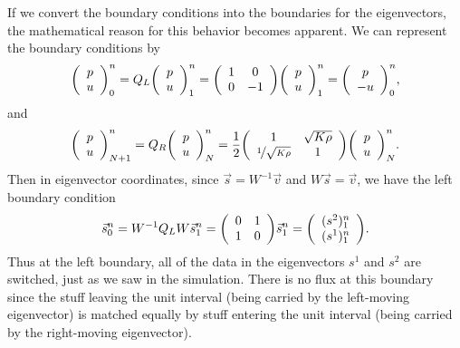 \documentclass[12pt]{article}
\begin{document}
 If we convert the boundary conditions into the boundaries for the eigenvectors, the mathematical reason for this behavior becomes apparent.
 We can represent the boundary conditions by
 $$\qty(\begin{array}{c} p \\ u \end{array})_{0}^n = Q_L \qty(\begin{array}{c} p \\ u \end{array})_{1}^n = \qty(\begin{array}{cc} 1 & 0 \\ 0 & -1 \end{array})\qty(\begin{array}{c} p \\ u \end{array})_{1}^n = \qty(\begin{array}{c} p \\ -u \end{array})_{0}^n,$$
 and 
  $$\qty(\begin{array}{c} p \\ u \end{array})_{N+1}^n = Q_R \qty(\begin{array}{c} p \\ u \end{array})_{N}^n = \dfrac{1}{2}\qty(\begin{array}{cc} 1 & \sqrt{K\rho} \\ \nicefrac{1}{\sqrt{K\rho}} & 1 \end{array})\qty(\begin{array}{c} p \\ u \end{array})_{N}^n.$$
  Then in eigenvector coordinates, since $\vec{s} = W^{-1}\vec{v}$ and $W\vec{s}=\vec{v}$, we have the left boundary condition
  $$\vec{s}_0^n = W^{-1}Q_LW\vec{s}_1^n =\qty(\begin{array}{cc} 0 & 1 \\  1  & 0\end{array}) \vec{s}_1^n = \qty(\begin{array}{c} (s^2)^n_1 \\ (s^1)^n_1 \end{array}).$$
  Thus at the left boundary, all of the data in the eigenvectors $s^1$ and $s^2$ are switched, just as we saw in the simulation.  There is no flux at this boundary since the stuff leaving the unit interval (being carried by the left-moving eigenvector) is matched equally by stuff entering the unit interval (being carried by the right-moving eigenvector).
\end{document}
